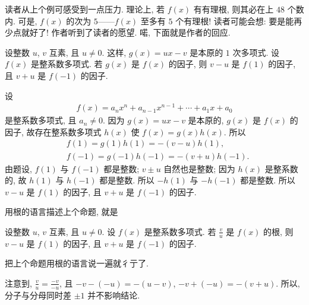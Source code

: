 读者从上个例可感受到一点压力. 理论上, 若 $f(x)$ 有有理根, 则其必在上 $48$ 个数内. 可是, $f(x)$ 的次为 $5$——$f(x)$ 至多有 $5$ 个有理根! 读者可能会想: 要是能再少点就好了! 作者听到了读者的愿望. 喏, 下面就是作者的回应.

\begin{proposition}
    设整数 $u$, $v$ 互素, 且 $u \neq 0$. 这样, $g(x) = ux - v$ 是本原的 $1$ 次多项式. 设 $f(x)$ 是整系数多项式. 若 $g(x)$ 是 $f(x)$ 的因子, 则 $v - u$ 是 $f(1)$ 的因子, 且 $v + u$ 是 $f(-1)$ 的因子.
\end{proposition}

\begin{pf}
    设
    \begin{align*}
        f(x) = a_n x^n + a_{n-1} x^{n-1} + \cdots + a_1 x + a_0
    \end{align*}
    是整系数多项式, 且 $a_n \neq 0$. 因为 $g(x) = ux - v$ 是本原的, $g(x)$ 是 $f(x)$ 的因子, 故存在整系数多项式 $h(x)$ 使 $f(x) = g(x)h(x)$. 所以
    \begin{align*}
         & f(1) = g(1) h(1) = -(v - u)h(1),     \\
         & f(-1) = g(-1) h(-1) = -(v + u)h(-1).
    \end{align*}
    由题设, $f(1)$ 与 $f(-1)$ 都是整数; $v \pm u$ 自然也是整数; 因为 $h(x)$ 是整系数的, 故 $h(1)$ 与 $h(-1)$ 都是整数. 所以 $-h(1)$ 与 $-h(-1)$ 都是整数. 所以 $v - u$ 是 $f(1)$ 的因子, 且 $v + u$ 是 $f(-1)$ 的因子.
\end{pf}

用根的语言描述上个命题, 就是
\begin{proposition}
    设整数 $u$, $v$ 互素, 且 $u \neq 0$. 设 $f(x)$ 是整系数多项式. 若 $\frac{v}{u}$ 是 $f(x)$ 的根, 则 $v - u$ 是 $f(1)$ 的因子, 且 $v + u$ 是 $f(-1)$ 的因子.
\end{proposition}

\begin{pf}
    把上个命题用根的语言说一遍就彳亍了.
\end{pf}

\begin{remark}
    注意到, $\frac{v}{u} = \frac{-v}{-u}$, 且 $-v - (-u) = -(u - v)$, $-v + (-u) = -(v + u)$. 所以, 分子与分母同时差 $\pm 1$ 并不影响结论.
\end{remark}

